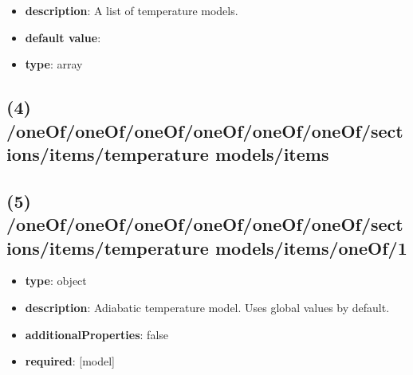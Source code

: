 \begin{itemize}[leftmargin=3em]\item {\bf description}: A list of temperature models.
\item {\bf default value}: 
\item {\bf type}: array
\end{itemize}\subsection{(4) /oneOf/oneOf/oneOf/oneOf/oneOf/oneOf/sections/items/temperature models/items}

\subsection{(5) /oneOf/oneOf/oneOf/oneOf/oneOf/oneOf/sections/items/temperature models/items/oneOf/1}
\begin{itemize}[leftmargin=5em]\item {\bf type}: object
\item {\bf description}: Adiabatic temperature model. Uses global values by default.
\item {\bf additionalProperties}: false
\item {\bf required}: [model]\end{itemize}
